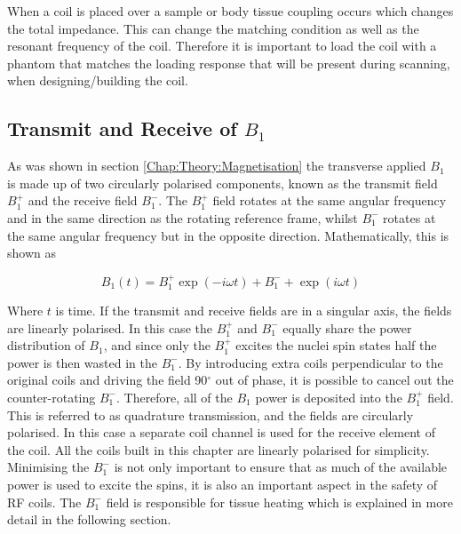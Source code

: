 When a coil is placed over a sample or body tissue coupling occurs which changes the total impedance. This can change the matching condition as well as the resonant frequency of the coil. Therefore it is important to load the coil with a phantom that matches the loading response that will be present during scanning, when designing/building the coil.

\subsection{Transmit and Receive of \texorpdfstring{$B_1$}{B1}}


As was shown in section \ref{Chap:Theory:Magnetisation} the transverse applied $B_1$ is made up of two circularly polarised components, known as the transmit field $B_1^+$ and the receive field $B_1^-$. The $B_1^+$ field rotates at the same angular frequency and in the same direction as the rotating reference frame, whilst $B_1^-$ rotates at the same angular frequency but in the opposite direction. Mathematically, this is shown as 

\begin{equation}
    B_1(t) = B_1^+\exp(-i\omega t) +B_1^-+\exp(i\omega t)
\end{equation}

Where $t$ is time. If the transmit and receive fields are in a singular axis, the fields are linearly polarised. In this case the $B_1^+$ and $B_1^-$ equally share the power distribution of $B_1$, and since only the $B_1^+$ excites the nuclei spin states half the power is then wasted in the $B_1^-$. By introducing extra coils perpendicular to the original coils and driving the field 90$^\circ$ out of phase, it is possible to cancel out the counter-rotating $B_1^-$. Therefore, all of the $B_1$ power is deposited into the $B_1^+$ field. This is referred to as quadrature transmission, and the fields are circularly polarised. In this case a separate coil channel is used for the receive element of the coil. All the coils built in this chapter are linearly polarised for simplicity. Minimising the $B_1^-$ is not only important to ensure that as much of the available power is used to excite the spins, it is also an important aspect in the safety of \ac{RF} coils. The $B_1^-$ field is responsible for tissue heating which is explained in more detail in the following section. 


